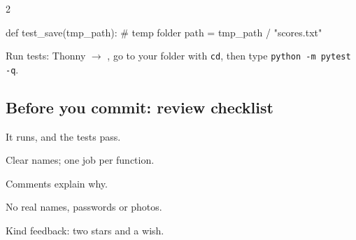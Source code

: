 \documentclass[level=3]{kidscode}
\begin{document}
\begin{multicols}{2}
\begin{sheetcode}
def test_save(tmp_path):  # temp folder
    path = tmp_path / "scores.txt"
\end{sheetcode}
Run tests: Thonny  $\rightarrow$ , go to your folder with
\texttt{cd}, then type \texttt{python -m pytest -q}.

\subsection{Before you commit: review checklist}
\begin{checklist}
  \item It runs, and the tests pass.
  \item Clear names; one job per function.
  \item Comments explain why.
  \item No real names, passwords or photos.
  \item Kind feedback: two stars and a wish.
\end{checklist}

\end{multicols}
\end{document}
